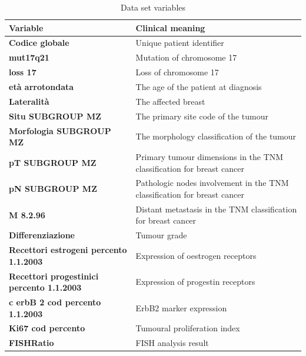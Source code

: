 \begin{table}[htbp]
\centering
\caption{Data set variables}
\begin{tabularx}{\textwidth}{@{} l Y @{}}
\toprule 
\textbf{Variable} & Clinical meaning \\
\midrule 
\textbf{Codice globale} & Unique patient identifier \\
\textbf{mut17q21} & Mutation of chromosome 17 \\
\textbf{loss 17} & Loss of chromosome 17 \\
\textbf{et\`a arrotondata} & The age of the patient at diagnosis \\
\textbf{Lateralit\`a} & The affected breast \\
\textbf{Situ SUBGROUP MZ} & The primary site code of the tumour \\
\textbf{Morfologia SUBGROUP MZ} & The morphology classification of the tumour \\
\textbf{pT SUBGROUP MZ} & Primary tumour dimensions in the TNM classification for breast cancer \\
\textbf{pN SUBGROUP MZ} & Pathologic nodes involvement in the TNM classification for breast cancer \\
\textbf{M 8.2.96} & Distant metastasis in the TNM classification for breast cancer \\
\textbf{Differenziazione} & Tumour grade \\
\textbf{Recettori estrogeni percento 1.1.2003} & Expression of oestrogen receptors \\
\textbf{Recettori progestinici percento 1.1.2003} & Expression of progestin receptors \\
\textbf{c erbB 2  cod percento 1.1.2003} & ErbB2 marker expression \\
\textbf{Ki67 cod percento} & Tumoural proliferation index \\
\textbf{FISHRatio} & FISH analysis result \\
\bottomrule
\end{tabularx}
\label{tab:datasetvariables}
\end{table}

